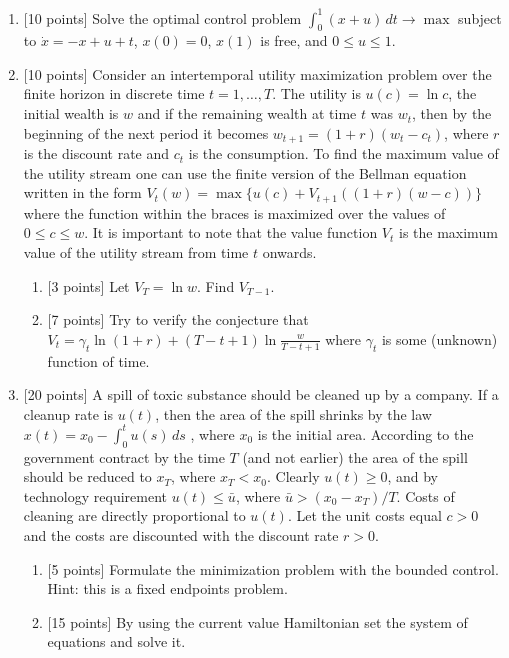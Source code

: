 \documentclass[pdftex,12pt,a4paper]{article}
\begin{document}
\begin{enumerate}
\item $[$10 points] Solve the optimal control problem 
$\int_0^1 (x+u)\, dt \to \max$
subject to $\dot{x}=-x+u+t$, $x(0)=0$, $x(1)$ is free, and $0\leq u\leq 1$.

\item $[$10 points] Consider an intertemporal utility maximization problem over the finite horizon in discrete time $t=1,\ldots,T$. The utility is $u(c)=\ln c$, the initial wealth is $w$ and if the remaining wealth at time $t$ was $w_t$, then by the beginning of the next period it becomes $w_{t+1}=(1+r)(w_t-c_t)$, where $r$ is the discount rate and $c_t$ is the consumption.  To find the maximum value of the utility stream one can use the finite version of the Bellman equation written in the form
$V_t(w)=\max \{ u(c) + V_{t+1}((1+r)(w-c)) \}$
where the function within the braces is maximized over the values of $0 \leq c \leq w$. It is important to note that the value function $V_t$ is the maximum value of the utility stream from time $t$ onwards.
\begin{enumerate}
\item $[$3 points] Let $V_T=\ln w$. Find $V_{T-1}$.
\item $[$7 points] Try to verify the conjecture that 
$V_t=\gamma_t \ln (1+r) + (T-t+1) \ln \frac{w}{T-t+1} $
where $\gamma_t$ is some (unknown) function of time.
\end{enumerate}

\item $[$20 points] A spill of toxic substance should be cleaned up by a company.  If a cleanup rate is $u(t)$, then the area of the spill shrinks by the law 
$x(t)=x_0-\int_0^t u(s)\, ds$
, where $x_0$ is the initial area. According to the government contract by the time $T$ (and not earlier) the area of the spill should  be reduced to $x_T$, where $x_T<x_0$.  Clearly $u(t)\geq 0$, and by technology requirement $u(t)\leq \bar{u}$, where $\bar{u}>(x_0-x_T)/T$. Costs of cleaning are directly proportional to $u(t)$. Let the unit costs equal $c>0$ and the costs are discounted with the discount rate $r>0$.
\begin{enumerate}
\item $[$5 points] Formulate the minimization problem with the bounded control. Hint: this is a fixed endpoints problem.
\item $[$15 points] By using the current value Hamiltonian set the system of equations and solve it.  
\end{enumerate}
\end{enumerate}
\end{document}

